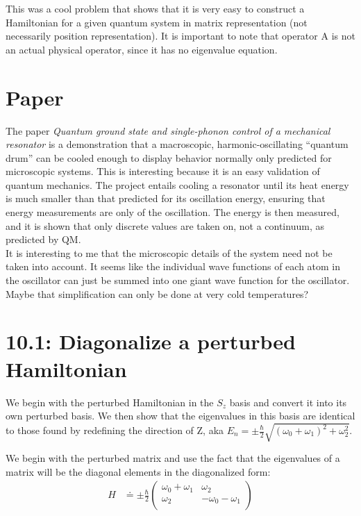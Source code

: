 \documentclass[10pt]{article} %
\begin{document}
This was a cool problem that shows that it is very easy to construct a Hamiltonian for a given
quantum system in matrix representation (not necessarily position representation). It is
important to note that operator A is not an actual physical operator, since it has no eigenvalue
equation.\\

\clearpage

\section{Paper}
The paper \textit{Quantum ground state and single-phonon control of a mechanical resonator} is a
demonstration that a macroscopic, harmonic-oscillating ``quantum drum'' can be cooled enough to
display behavior normally only predicted for microscopic systems. This is interesting because it
is an easy validation of quantum mechanics. The project entails cooling a resonator until its
heat energy is much smaller than that predicted for its oscillation energy, ensuring that
energy measurements are only of the oscillation. The energy is then measured, and it is shown that
only discrete values are taken on, not a continuum, as predicted by QM.\\

It is interesting to me that the microscopic details of the system need not be taken into account.
It seems like the individual wave functions of each atom in the oscillator can just be summed
into one giant wave function for the oscillator. Maybe that simplification can only be done at
very cold temperatures?\\

\section{10.1: Diagonalize a perturbed Hamiltonian}
We begin with the perturbed Hamiltonian in the $S_z$ basis and convert it into its own perturbed
basis. We then show that the eigenvalues in this basis are identical to those found by redefining
the direction of Z, aka $E_n = \pm \frac{\hbar}{2} \sqrt{(\omega_0 + \omega_1)^2 + \omega_2^2}$.

We begin with the perturbed matrix and use the fact that the eigenvalues of a matrix will be the
diagonal elements in the diagonalized form:\\

\begin{align*}
  H &\doteq
  \pm\frac{\hbar}{2}
  \begin{pmatrix}
    \omega_0 + \omega_1 & \omega_2\\
    \omega_2 & -\omega_0 - \omega_1\\
  \end{pmatrix}\\
\end{align*}
\end{document}

